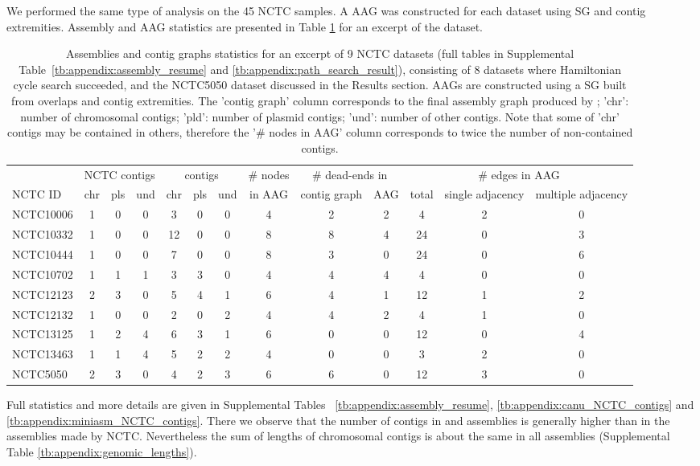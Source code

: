 \documentclass[./main.tex]{subfiles}
\newcommand{\modafterreview}[1]{#1}
\begin{document}
We performed the same type of analysis on the 45 NCTC samples. A \minimap AAG was constructed for each dataset using SG and \canu contig extremities. Assembly and AAG statistics are presented in Table \ref{tab:file_assembly_and_path_search_resume} for an excerpt of the dataset. 
\begin{table}[htbp]
    \centering
    \small
    \modafterreview{
    \begin{tabular}{l|ccc|ccc|c|cc|ccc}
    \hline
     & \multicolumn{3}{c|}{NCTC contigs} & \multicolumn{3}{c|}{\canu contigs} &
     {\# nodes} &
     \multicolumn{2}{c|}{\# dead-ends in} & \multicolumn{3}{c}{\# edges in AAG} \\
    NCTC ID & chr & pls & und & chr & pls & und & in AAG & contig graph &  AAG & total & single adjacency & multiple adjacency
    \\\hline
    NCTC10006 & 1 & 0 & 0 & 3  & 0 & 0 &    4  & 2  & 2 & 4  & 2 & 0 \\
    NCTC10332 & 1 & 0 & 0 & 12 & 0 & 0 &    8  & 8  & 4 & 24 & 0 & 3 \\
    NCTC10444 & 1 & 0 & 0 & 7  & 0 & 0 &    8  & 3  & 0 & 24 & 0 & 6 \\
    NCTC10702 & 1 & 1 & 1 & 3  & 3 & 0 &    4  & 4  & 4 & 4 & 0 & 0 \\
    NCTC12123 & 2 & 3 & 0 & 5  & 4 & 1 &    6  & 4  & 1 & 12 & 1 & 2 \\
    NCTC12132 & 1 & 0 & 0 & 2  & 0 & 2 &    4  & 4  & 2 & 4  & 1 & 0 \\
    NCTC13125 & 1 & 2 & 4 & 6  & 3 & 1 &    6  & 0  & 0 & 12 & 0 & 4 \\
    NCTC13463 & 1 & 1 & 4 & 5  & 2 & 2 &    4  & 0  & 0 & 3  & 2 & 0 \\
    NCTC5050  & 2 & 3 & 0 & 4  & 2 & 3 &    6  & 6  & 0 & 12 & 3 & 0 \\
    \hline
    \end{tabular}
    }
    \caption{Assemblies and contig graphs statistics for an excerpt of 9 NCTC datasets (full tables in Supplemental Table~\ref{tb:appendix:assembly_resume} and \ref{tb:appendix:path_search_result}), consisting of 8 datasets where Hamiltonian cycle search succeeded, and the NCTC5050 dataset discussed in the Results section. AAGs are constructed using a SG built from \minimap overlaps and \canu contig extremities.  The 'contig graph' column corresponds to the final assembly graph produced by \canu; 'chr': number of chromosomal contigs; 'pld': number of plasmid contigs; 'und': number of other contigs. Note that some of \canu\xspace 'chr' contigs may be contained in others, therefore the '\# nodes in AAG' column corresponds to twice the number of non-contained contigs.}
    \label{tab:file_assembly_and_path_search_resume}
\end{table}
Full statistics and more details are given in Supplemental Tables ~\ref{tb:appendix:assembly_resume}, \ref{tb:appendix:canu_NCTC_contigs} and \ref{tb:appendix:miniasm_NCTC_contigs}. 
There we observe that the number of contigs in \canu and \miniasm    assemblies is generally higher than in the assemblies made by NCTC.
%
Nevertheless the sum of lengths of chromosomal contigs is about the same in all assemblies (Supplemental Table \ref{tb:appendix:genomic_lengths}).
\end{document}
